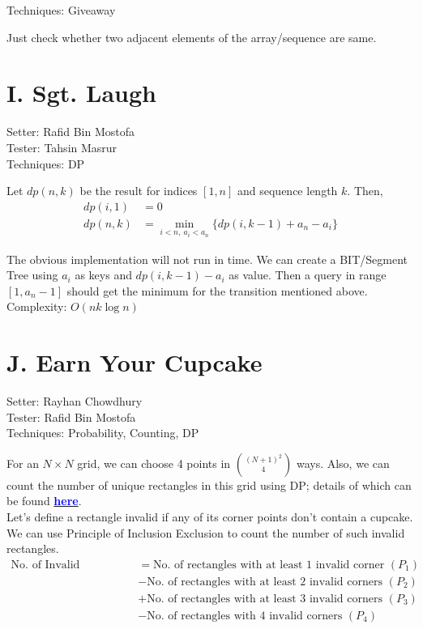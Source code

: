 \documentclass{article}
\begin{document}
\noindent Techniques: Giveaway

\vspace{0.5cm}
Just check whether two adjacent elements of the array/sequence are same.

\section*{I. Sgt. Laugh}
\noindent Setter: Rafid Bin Mostofa \\
\noindent Tester: Tahsin Masrur \\
\noindent Techniques: DP

\vspace{0.5cm}
Let $dp(n, k)$ be the result for indices $[1, n]$ and sequence length $k$. Then,
\begin{align}
    dp(i, 1) &= 0 \\
    dp(n, k) &= \min\limits_{i<n, ~a_i<a_n} \{dp(i, k-1) + a_n - a_i\}
\end{align}

The obvious implementation will not run in time. We can create a BIT/Segment Tree using $a_i$ as keys and $dp(i, k-1) - a_i$ as value. Then a query in range $[1, a_n - 1]$ should get the minimum for the transition mentioned above.\\

Complexity: $O(nk \log n)$

\section*{J. Earn Your Cupcake}
\noindent Setter: Rayhan Chowdhury \\
\noindent Tester: Rafid Bin Mostofa \\
\noindent Techniques: Probability, Counting, DP

\vspace{0.5cm}

For an $N \times N$ grid, we can choose 4 points in $\binom{(N+1)^2}{4}$ ways. Also, we can count the number of unique rectangles in this grid using DP; details of which can be found \href{https://medium.com/@rayhanchowdhury/pizza-from-spongebob-editorial-ab2e4ad41a2}{\textcolor{blue}{\textbf{here}}}. \\

Let's define a rectangle invalid if any of its corner points don't contain a cupcake. We can use Principle of Inclusion Exclusion to count the number of such invalid rectangles.
\begin{align*}
    \text{No. of Invalid rectangles} & = \text{No. of rectangles with at least 1 invalid corner } (P_1) \\
    & - \text{No. of rectangles with at least 2 invalid corners } (P_2)\\
    & + \text{No. of rectangles with at least 3 invalid corners } (P_3)\\
    & - \text{No. of rectangles with 4 invalid corners } (P_4)\\
\end{align*}
\end{document}
